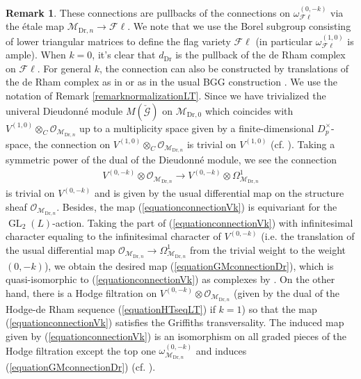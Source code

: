 \documentclass{article}
\theoremstyle{definition}
\newtheorem{remark}[theorem]{Remark}
\def\calG{\mathcal{G}}
\def\calM{\mathcal{M}}
\def\calO{\mathcal{O}}
\DeclareMathOperator{\ox}{\otimes}
\DeclareMathOperator{\GL}{GL}
\def\fl{\mathscr{F}\ell}
\def\Dr{\mathrm{Dr}}
\begin{document}
\begin{remark}\label{remarktranslation}
    These connections are pullbacks of the connections on $\omega_{\fl}^{(0,-k)}$ via the \'etale map $\calM_{\Dr,n}\to \fl$. We note that we use the Borel subgroup consisting of lower triangular matrices to define the flag variety $\fl$ (in particular $\omega_{\fl}^{(1,0)}$ is ample). When $k=0$, it's clear that $d_{\Dr}$ is the pullback of the de Rham complex on $\fl$. For general $k$, the connection can also be constructed by translations of the de Rham complex as in \cite[Lemma 5.6.6]{PanII} or as in the usual BGG construction \cite{faltings2006cohomology}. We use the notation of Remark \ref{remarknormalizationLT}. Since we have trivialized the univeral Dieudonn\'e module $M(\check{\calG})$ on $\calM_{\Dr,0}$ \cite[Proposition 5.15]{RZ96} which coincides with $V^{(1,0)}\ox_C \calO_{\calM_{\Dr,n}}$ up to a multiplicity space given by a finite-dimensional $D_p^\times$-space, the connection on $V^{(1,0)}\ox_C \calO_{\calM_{\Dr,n}}$ is trivial on $V^{(1,0)}$ (cf. \cite[Lemma 3.11]{vanhaecke2024cohomologie}). Taking a symmetric power of the dual of the Dieudonn\'e module, we see the connection 
    \begin{align}\label{equationconnectionVk}
        V^{(0,-k)}\ox \calO_{\calM_{\Dr,n}}\to V^{(0,-k)}\ox \Omega^1_{\calM_{\Dr,n}}    
    \end{align}
    is trivial on $V^{(0,-k)}$ and is given by the usual differential map on the structure sheaf $\calO_{\calM_{\Dr,n}}$. Besides, the map (\ref{equationconnectionVk}) is equivariant for the $\GL_2(L)$-action. Taking the part of (\ref{equationconnectionVk}) with infinitesimal character equaling to the infinitesimal character of $V^{(0,-k)}$ (i.e. the translation of the usual differential map $\calO_{\calM_{\Dr,n}}\to \Omega^1_{\calM_{\Dr,n}}$ from the trivial weight to the weight $(0,-k)$), we obtain the desired map (\ref{equationGMconnectionDr}), which is quasi-isomorphic to (\ref{equationconnectionVk}) as complexes by \cite[Lemma 5.6.6]{PanII}. On the other hand, there is a Hodge filtration on $V^{(0,-k)}\ox \calO_{\calM_{\Dr,n}}$ (given by the dual of the Hodge-de Rham sequence (\ref{equationHTseqLT}) if $k=1$) so that the map (\ref{equationconnectionVk}) satisfies the Griffiths transversality. The induced map given by (\ref{equationconnectionVk}) is an isomorphism on all graded pieces of the Hodge filtration except the top one $\omega_{\calM_{\Dr,n}}^{(0,-k)}$ and induces (\ref{equationGMconnectionDr}) (cf. \cite[Lemma 9.8]{vanhaecke2024cohomologie}). 
\end{remark} 
\end{document}
